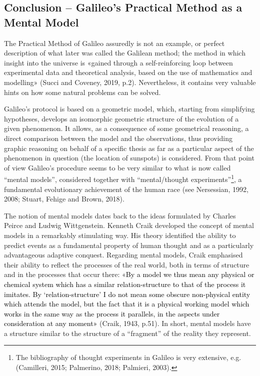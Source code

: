 \begin{artengenv}
\section{Conclusion -- Galileo’s Practical Method as a Mental Model}

The Practical Method of Galileo assuredly is not an example, or perfect description of what later was called the
Galilean method; the method in which insight into the universe is «gained through a self-reinforcing loop between
experimental data and theoretical analysis, based on the use of mathematics and modelling»
\label{ref:RNDOyv2c9QvdT}(Succi and Coveney, 2019, p.2). Nevertheless, it contains very valuable hints on how some
natural problems can be solved.

Galileo’s protocol is based on a geometric model, which, starting from simplifying hypotheses, develops an isomorphic
geometric structure of the evolution of a given phenomenon. It allows, as a consequence of some geometrical reasoning,
a direct comparison between the model and the observations, thus providing graphic reasoning on behalf of a specific
thesis as far as a particular aspect of the phenomenon in question (the location of sunspots) is considered. From that
point of view Galileo’s procedure seems to be very similar to what is now called “mental models”, considered together
with “mental/thought experiments”\footnote{ The bibliography of thought experiments in Galileo is very extensive, e.g.
\label{ref:RNDMucBAFXpFg}(Camilleri, 2015; Palmerino, 2018; Palmieri, 2003). }, a fundamental evolutionary achievement
of the human race \label{ref:RNDzUssfgcd3F}(see Nersessian, 1992, 2008; Stuart, Fehige and Brown, 2018).

The notion of mental models dates back to the ideas formulated by Charles Peirce and Ludwig Wittgenstein. Kenneth Craik
developed the concept of mental models in a remarkably stimulating way. His theory identified the ability to predict
events as a fundamental property of human thought and as a particularly advantageous adaptive conquest. Regarding
mental models, Craik emphasised their ability to reflect the processes of the real world, both in terms of structure
and in the processes that occur there: «\textcolor{black}{By a model we thus mean any physical or chemical system which
has a similar relation-structure to that of the process it imitates. By ‘relation-structure’ I do not mean some obscure
non-physical entity which attends the model, but the fact that it is a physical working model which works in the same
way as the process it parallels, in the aspects under consideration at any moment»} \label{ref:RNDCqLUJ0e2RC}(Craik,
1943, p.51). In short, mental models have a structure similar to the structure of a “fragment” of the reality they
represent.


\end{artengenv}
